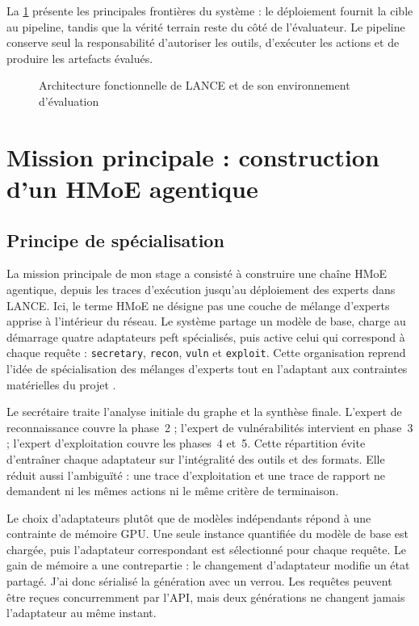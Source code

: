 La \cref{fig:architecture-lance} présente les principales frontières du système :
le déploiement fournit la cible au pipeline, tandis que la vérité terrain reste
du côté de l'évaluateur. Le pipeline conserve seul la responsabilité d'autoriser
les outils, d'exécuter les actions et de produire les artefacts évalués.

\begin{figure}[htbp]
  \centering
  \resizebox{\textwidth}{!}{}
  \caption{Architecture fonctionnelle de LANCE et de son environnement d'évaluation}
  \label{fig:architecture-lance}
\end{figure}


\section{Mission principale : construction d'un HMoE agentique}

\subsection{Principe de spécialisation}

La mission principale de mon stage a consisté à construire une chaîne HMoE
agentique, depuis les traces d'exécution jusqu'au déploiement des experts dans
LANCE. Ici, le terme HMoE ne désigne pas une couche de mélange d'experts apprise
à l'intérieur du réseau. Le système partage un modèle de base, charge au
démarrage quatre adaptateurs \gls{peft} spécialisés, puis active celui qui
correspond à chaque requête : \texttt{\footnotesize secretary}, \texttt{\footnotesize recon},
\texttt{\footnotesize vuln} et \texttt{\footnotesize exploit}. Cette organisation reprend
l'idée de spécialisation des mélanges d'experts tout en l'adaptant aux
contraintes matérielles du projet \cite{shazeer2017moe}.

Le secrétaire traite l'analyse initiale du graphe et la synthèse finale. L'expert
de reconnaissance couvre la phase~2 ; l'expert de vulnérabilités intervient en
phase~3 ; l'expert d'exploitation couvre les phases~4 et~5. Cette répartition
évite d'entraîner chaque adaptateur sur l'intégralité des outils et des formats.
Elle réduit aussi l'ambiguïté : une trace d'exploitation et une trace de rapport
ne demandent ni les mêmes actions ni le même critère de terminaison.

Le choix d'adaptateurs plutôt que de modèles indépendants répond à une
contrainte de mémoire GPU. Une seule instance quantifiée du modèle de base est
chargée, puis l'adaptateur correspondant est sélectionné pour chaque requête. Le gain de
mémoire a une contrepartie : le changement d'adaptateur modifie un état partagé.
J'ai donc sérialisé la génération avec un verrou. Les requêtes peuvent être
reçues concurremment par l'API, mais deux générations ne changent jamais
l'adaptateur au même instant.


